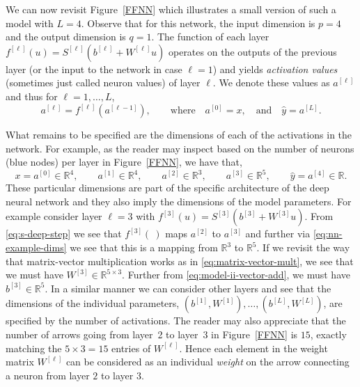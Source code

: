 \documentclass[12pt]{article}
\begin{document}
We can now revisit Figure~\ref{FFNN} which illustrates a small version of such a model with $L=4$. Observe that for this network,  the input dimension is $p=4$ and the output dimension is $q=1$. The function of each layer $f^{[\ell]}(u) = S^{[\ell]}(b^{[\ell]} + W^{[\ell]} u)$ operates on the outputs of the previous layer (or the input to the network in case $\ell=1$) and yields {\em activation values} (sometimes just called neuron values) of layer $\ell$. We denote these values as $a^{[\ell]}$ and thus for $\ell=1,\ldots,L$,
%
\begin{equation}
\label{eq:s-deep-step}
a^{[\ell]} = f^{[\ell]}(a^{[\ell-1]}),
\qquad
\textrm{where}
\quad
a^{[0]} = x,
\quad
\text{and}
\quad
\hat{y} = a^{[L]}.
\end{equation}
%

What remains to be specified are the dimensions of each of the activations in the network. For example, as the reader may inspect based on the number of neurons (blue nodes) per layer in Figure~\ref{FFNN}, we have that,
%
\begin{equation}
\label{eq:nn-example-dims}
x = a^{[0]} \in {\mathbb R}^4,
\qquad
a^{[1]} \in {\mathbb R}^4,
\qquad
a^{[2]} \in {\mathbb R}^3,
\qquad
a^{[3]} \in {\mathbb R}^5,
\qquad
\hat{y} = a^{[4]} \in {\mathbb R}.
\end{equation}
%
These particular dimensions are part of the specific architecture of the deep neural network and they also imply the dimensions of the model parameters. For example consider layer $\ell=3$ with $f^{[3]}(u) = S^{[3]}(b^{[3]} + W^{[3]} u)$. From \eqref{eq:s-deep-step} we see that $f^{[3]}(~)$ maps $a^{[2]}$ to $a^{[3]}$ and further via \eqref{eq:nn-example-dims} we see that this is a mapping from ${\mathbb R}^3$ to ${\mathbb R}^5$. If we revisit the way that matrix-vector multiplication works as in \eqref{eq:matrix-vector-mult}, we see that we must have $W^{[3]} \in {\mathbb R^{5 \times 3}}$. Further from \eqref{eq:model-ii-vector-add}, we must have $b^{[3]} \in {\mathbb R}^5$. In a similar manner we can consider other layers and see that the dimensions of the individual parameters, $(b^{[1]}, W^{[1]}), \ldots, (b^{[L]}, W^{[L]})$, are specified by the number of activations. The reader may also appreciate that the number of arrows going from layer~2 to layer~3 in Figure~\ref{FFNN} is $15$, exactly matching the $5\times 3=15$ entries of $W^{[\ell]}$. Hence each element in the weight matrix $W^{[\ell]}$ can be considered as an individual {\em weight} on the arrow connecting a neuron from layer $2$ to layer $3$.
\end{document}
